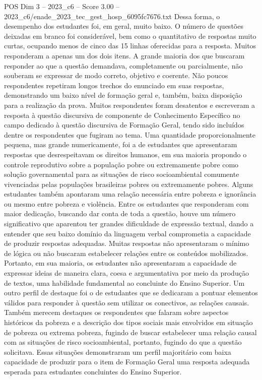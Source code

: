 \begin{textsample}{POS Dim 3 – 2023\_c6 – Score 3.00 – 2023\_c6/enade\_2023\_tec\_gest\_hosp\_6095fc7676.txt}
Dessa forma, o desempenho dos estudantes foi, em geral, muito baixo.
O número de questões deixadas em branco foi considerável, bem como o quantitativo de respostas muito curtas, ocupando menos de cinco das 15 linhas oferecidas para a resposta.
Muitos responderam a apenas um dos dois itens.
A grande maioria dos que buscaram responder ao que a questão demandava, completamente ou parcialmente, não souberam se expressar de modo correto, objetivo e coerente.
Não poucos respondentes repetiram longos trechos do enunciado em suas respostas, demonstrando um baixo nível de formação geral e, também, baixa disposição para a realização da prova.
Muitos respondentes foram desatentos e escreveram a resposta à questão discursiva de componente de Conhecimento Específico no campo dedicado à questão discursiva de Formação Geral, tendo sido incluídos dentre os respondentes que fugiram ao tema.
Uma quantidade proporcionalmente pequena, mas grande numericamente, foi a de estudantes que apresentaram respostas que desrespeitavam os direitos humanos, em sua maioria propondo o controle reprodutivo sobre a população pobre ou extremamente pobre como solução governamental para as situações de risco socioambiental comumente vivenciadas pelas populações brasileiras pobres ou extremamente pobres.
Alguns estudantes também apontaram uma relação necessária entre pobreza e ignorância ou mesmo entre pobreza e violência.
Entre os estudantes que responderam com maior dedicação, buscando dar conta de toda a questão, houve um número significativo que aparentou ter grandes dificuldade de expressão textual, dando a entender que seu baixo domínio da linguagem verbal comprometia a capacidade de produzir respostas adequadas.
Muitas respostas não apresentaram o mínimo de lógica ou não buscaram estabelecer relações entre os conteúdos mobilizados.
Portanto, em sua maioria, os estudantes não apresentaram a capacidade de expressar ideias de maneira clara, coesa e argumentativa por meio da produção de textos, uma habilidade fundamental ao concluinte do Ensino Superior.
Um outro perfil de destaque foi o de estudantes que se dedicaram a pontuar elementos válidos para responder à questão sem utilizar os conectivos, as relações causais.
Também merecem destaques os respondentes que falaram sobre aspectos históricos da pobreza e a descrição dos tipos sociais mais envolvidos em situação de pobreza ou extrema pobreza, fugindo de buscar estabelecer uma relação causal com as situações de risco socioambiental, portanto, fugindo do que a questão solicitava.
Essas situações demonstraram um perfil majoritário com baixa capacidade de produzir para o item de Formação Geral uma resposta adequada esperada para estudantes concluintes do Ensino Superior.

\end{textsample}

